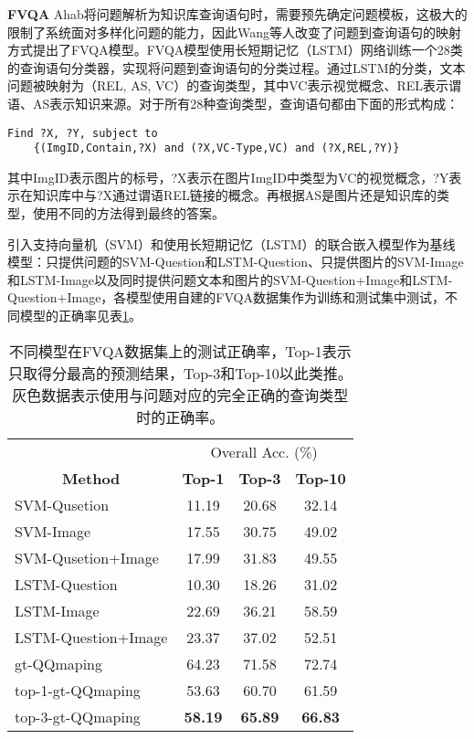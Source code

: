 \textbf{FVQA}
Ahab将问题解析为知识库查询语句时，需要预先确定问题模板，这极大的限制了系统面对多样化问题的能力，因此Wang等人改变了问题到查询语句的映射方式提出了FVQA模型。FVQA模型使用长短期记忆（LSTM）网络训练一个28类的查询语句分类器，实现将问题到查询语句的分类过程。通过LSTM的分类，文本问题被映射为（REL, AS, VC）的查询类型，其中VC表示视觉概念、REL表示谓语、AS表示知识来源。对于所有28种查询类型，查询语句都由下面的形式构成：
\begin{verbatim}
Find ?X, ?Y, subject to 
	{(ImgID,Contain,?X) and (?X,VC-Type,VC) and (?X,REL,?Y)}
\end{verbatim}
其中ImgID表示图片的标号，?X表示在图片ImgID中类型为VC的视觉概念，?Y表示在知识库中与?X通过谓语REL链接的概念。再根据AS是图片还是知识库的类型，使用不同的方法得到最终的答案。

引入支持向量机（SVM）和使用长短期记忆（LSTM）的联合嵌入模型作为基线模型：只提供问题的SVM-Question和LSTM-Question、只提供图片的SVM-Image和LSTM-Image以及同时提供问题文本和图片的SVM-Question+Image和LSTM-Question+Image，各模型使用自建的FVQA数据集作为训练和测试集中测试，不同模型的正确率见表\ref{fvqa_table}。
\begin{table}[H]
\caption{不同模型在FVQA数据集上的测试正确率，Top-1表示只取得分最高的预测结果，Top-3和Top-10以此类推。灰色数据表示使用与问题对应的完全正确的查询类型时的正确率。}
\begin{tabular}{lccc}
\toprule
\multicolumn{1}{c}{} & \multicolumn{3}{c}{Overall Acc. (\%)}\\
\cmidrule(r){2-4}
\multicolumn{1}{c}{\multirow{-2}{*}{\textbf{Method}}} & \textbf{Top-1}& \textbf{Top-3} & \textbf{Top-10} \\
\midrule
SVM-Qusetion        & 11.19 & 20.68 & 32.14 \\
SVM-Image           & 17.55 & 30.75 & 49.02 \\
SVM-Qusetion+Image  & 17.99 & 31.83 & 49.55 \\
LSTM-Question       & 10.30 & 18.26 & 31.02 \\
LSTM-Image          & 22.69 & 36.21 & 58.59 \\
LSTM-Question+Image & 23.37 & 37.02 & 52.51 \\
\midrule
\cellcolor[HTML]{C0C0C0}gt-QQmaping & \cellcolor[HTML]{C0C0C0}64.23 & \cellcolor[HTML]{C0C0C0}71.58 & \cellcolor[HTML]{C0C0C0}72.74 \\
top-1-gt-QQmaping & 53.63 & 60.70 & 61.59 \\ 
top-3-gt-QQmaping & \textbf{58.19} & \textbf{65.89} & \textbf{66.83} \\
\bottomrule
\end{tabular}
\label{fvqa_table} 
\end{table}

